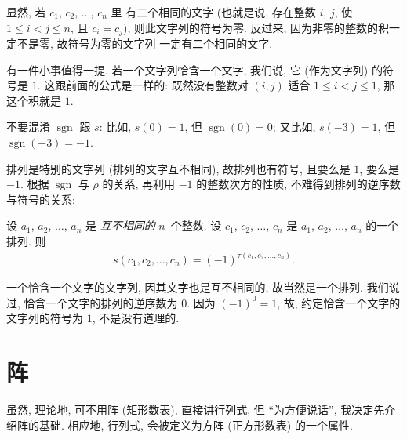 显然, 若 \(c_1\), \(c_2\), \(\dots\), \(c_n\) 里%
有二个相同的文字
(也就是说, 存在整数 \(i\), \(j\),
使 \(1 \leq i < j \leq n\),
且 \(c_i = c_j\)),
则此文字列的符号为零.
反过来, 因为非零的整数的积一定不是零,
故符号为零的文字列%
一定有二个相同的文字.

有一件小事值得一提.
若一个文字列恰含一个文字,
我们说, 它 (作为文字列) 的符号是 \(1\).
这跟前面的公式是一样的:
既然没有整数对 \((i, j)\) 适合 \(1 \leq i < j \leq 1\),
那这个积就是 \(1\).

不要混淆 \(\operatorname{sgn}\) 跟 \(s\):
比如, \(s(0) = 1\), 但 \(\operatorname{sgn} {(0)} = 0\);
又比如, \(s(-3) = 1\), 但 \(\operatorname{sgn} {(-3)} = -1\).

排列是特别的文字列
(排列的文字互不相同),
故排列也有符号,
且要么是 \(1\), 要么是 \(-1\).
根据 \(\operatorname{sgn}\) 与 \(\rho\) 的关系,
再利用 \(-1\) 的整数次方的性质,
不难得到排列的逆序数与符号的关系:

\begin{theorem}
    设 \(a_1\), \(a_2\), \(\dots\), \(a_n\) 是%
    \emph{互不相同的} \(n\)~个整数.
    设
    \(c_1\), \(c_2\), \(\dots\), \(c_n\)
    是 \(a_1\), \(a_2\), \(\dots\), \(a_n\) 的一个排列.
    则
    \begin{align*}
        s(c_1, c_2, \dots, c_n)
        = (-1)^{\tau(c_1, c_2, \dots, c_n)}.
    \end{align*}
\end{theorem}

一个恰含一个文字的文字列,
因其文字也是互不相同的,
故当然是一个排列.
我们说过, 恰含一个文字的排列的逆序数为 \(0\).
因为 \((-1)^0 = 1\),
故, 约定恰含一个文字的文字列的符号为 \(1\),
不是没有道理的.

\section{阵}

虽然, 理论地, 可不用阵 (矩形数表),
直接讲行列式,
但 ``为方便说话'', 我决定先介绍阵的基础.
相应地, 行列式, 会被定义为方阵
(正方形数表)
的一个属性.

